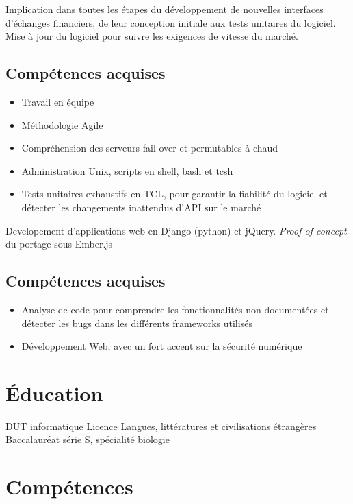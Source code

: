 \documentclass{cv}
\begin{document}
{Implication dans toutes les étapes du développement de nouvelles interfaces d'échanges financiers, de leur conception initiale aux tests unitaires du logiciel. Mise à jour du logiciel pour suivre les exigences de vitesse du marché.}
\subsection{Compétences acquises}
\begin{itemize}
    \item {Travail en équipe}
    \item {Méthodologie Agile}
    \item {Compréhension des serveurs fail-over et permutables à chaud}
    \item {Administration Unix, scripts en shell, bash et tcsh}
    \item {Tests unitaires exhaustifs en TCL, pour garantir la fiabilité du logiciel et détecter les changements inattendus d'API sur le marché}
\end{itemize}

\pagebreak
{}
{Developement d'applications web en Django (python) et jQuery. \textit{Proof of concept} du portage sous Ember.js}
\subsection{Compétences acquises}
\begin{itemize}
    \item {Analyse de code pour comprendre les fonctionnalités non documentées et détecter les bugs dans les différents frameworks utilisés}
    \item {Développement Web, avec un fort accent sur la sécurité numérique}
\end{itemize}

\section{Éducation}
{DUT informatique}
{Licence Langues, littératures et civilisations étrangères}
{Baccalauréat série S, spécialité biologie}

\section{Compétences}
\end{document}
